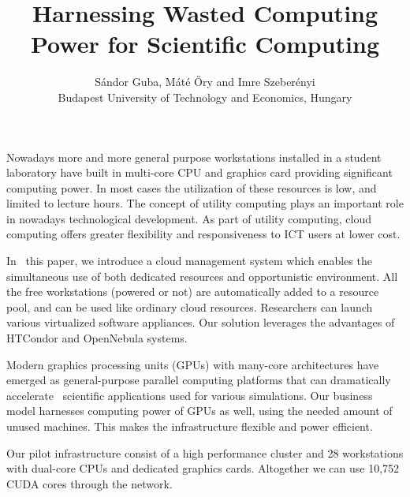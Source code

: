 \documentclass[12pt,a4paper]{article}
\title{Harnessing Wasted Computing Power for Scientific Computing}
\author{S\'andor Guba, M\'at\'e \H{O}ry and Imre Szeber\'enyi\\
Budapest University of Technology and Economics, %
Hungary}
\date{\empty}
\begin{document}
 
\maketitle


Nowadays more and more general purpose workstations installed in a student
laboratory have built in multi-core CPU and graphics card providing significant
computing power. In most cases the utilization of these resources is low, and
limited to lecture hours. The concept of utility computing plays an important
role in nowadays technological development. As part of utility computing, cloud
computing offers greater flexibility and responsiveness to ICT users at lower
cost.

In  this paper, we introduce a cloud management system which enables the
simultaneous use of both dedicated resources and opportunistic environment. All
the free workstations (powered or not) are automatically added to a resource
pool, and can be used like ordinary cloud resources. Researchers can launch
various virtualized software appliances. Our solution leverages the advantages
of HTCondor and OpenNebula systems.

Modern graphics processing units (GPUs) with many-core architectures have
emerged as general-purpose parallel computing platforms that can dramatically
accelerate  scientific applications used for various simulations. Our business
model harnesses computing power of GPUs as well, using the needed amount of
unused machines. This makes the infrastructure flexible and power efficient.

Our pilot infrastructure consist of a high performance cluster and 28
workstations with dual-core CPUs and dedicated graphics cards. Altogether we
can use 10,752 CUDA cores through the network.
\end{document}
